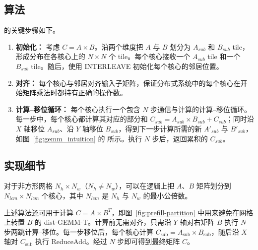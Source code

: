 \vspace{-0.3cm}
\subsection{\gemm 算法}\label{subsec:meshgemm}

\gemm 的关键步骤如下。

\begin{enumerate}[label=(\arabic*),leftmargin=0.5cm,noitemsep,topsep=0pt]
\item \textbf{初始化：} 考虑 $C=A\times B$。\gemm 沿两个维度把 $A$ 与 $B$ 划分为 $A_{sub}$ 和 $B_{sub}$ tile，形成分布在各核心上的 $N\times N$ 个 tile。每个核心接收一个 $A_{sub}$ tile 和一个 $B_{sub}$ tile。随后，\gemm 使用 INTERLEAVE 初始化每个核心的邻居位置。

\item \textbf{对齐：} 每个核心与邻居对齐输入子矩阵，保证分布式系统中的每个核心在开始矩阵乘法时都持有正确的操作数。

\item \textbf{计算--移位循环：} 每个核心执行一个包含 $N$ 步通信与计算的计算--移位循环。每一步中，每个核心都计算其对应的部分和 $C_{sub}=A_{sub}\times B_{sub}+C_{sub}$；同时沿 $X$ 轴移位 $A_{sub}$、沿 $Y$ 轴移位 $B_{sub}$，得到下一步计算所需的新 $A'_{sub}$ 与 $B'_{sub}$，如图~\ref{fig:gemm_intuition} 的  所示。执行 $N$ 步后，返回累积的 $C_{sub}$。
\end{enumerate}

\vspace{-0.3cm}
\subsection{实现细节}

 对于非方形网格 $N_h\times N_w$（$N_h\neq N_w$），可以在逻辑上把 $A$、$B$ 矩阵划分到 $N_{lcm}\times N_{lcm}$ 个核心，其中 $N_{lcm}$ 是 $N_h$ 与 $N_w$ 的最小公倍数。

 上述算法还可用于计算 $C=A\times B^T$，即图~\ref{fig:prefill-partition} 中用来避免在网格上转置 $B$ 的 dist-GEMM-T。计算前无需对齐，只需沿 $Y$ 轴对右矩阵 $B$ 执行 $N$ 步两跳计算--移位。每一步移位后，每个核心计算 $C_{\text{sub}}=A_{\text{sub}}\times B_{\text{sub}}$，随后沿 $X$ 轴对 $C_{\text{sub}}$ 执行 ReduceAdd。经过 $N$ 步即可得到最终矩阵 $C$。
